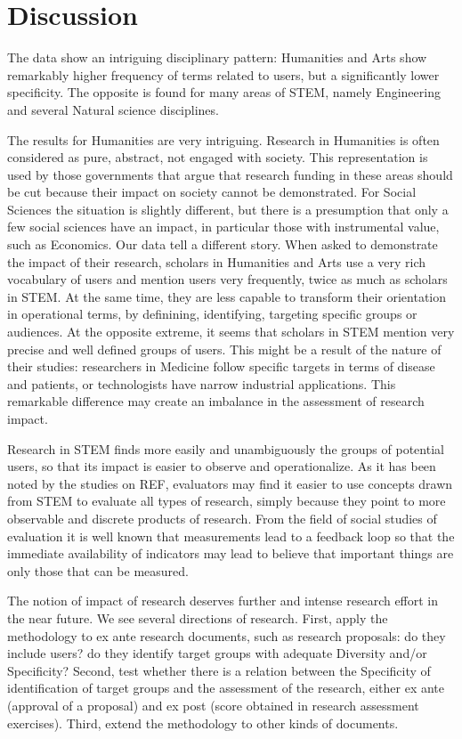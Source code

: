 \documentclass[]{book}
\begin{document}
\section{Discussion}\label{discussion-1}

The data show an intriguing disciplinary pattern: Humanities and Arts
show remarkably higher frequency of terms related to users, but a
significantly lower specificity. The opposite is found for many areas of
STEM, namely Engineering and several Natural science disciplines.

The results for Humanities are very intriguing. Research in Humanities
is often considered as pure, abstract, not engaged with society. This
representation is used by those governments that argue that research
funding in these areas should be cut because their impact on society
cannot be demonstrated. For Social Sciences the situation is slightly
different, but there is a presumption that only a few social sciences
have an impact, in particular those with instrumental value, such as
Economics. Our data tell a different story. When asked to demonstrate
the impact of their research, scholars in Humanities and Arts use a very
rich vocabulary of users and mention users very frequently, twice as
much as scholars in STEM. At the same time, they are less capable to
transform their orientation in operational terms, by definining,
identifying, targeting specific groups or audiences. At the opposite
extreme, it seems that scholars in STEM mention very precise and well
defined groups of users. This might be a result of the nature of their
studies: researchers in Medicine follow specific targets in terms of
disease and patients, or technologists have narrow industrial
applications. This remarkable difference may create an imbalance in the
assessment of research impact.

Research in STEM finds more easily and unambiguously the groups of
potential users, so that its impact is easier to observe and
operationalize. As it has been noted by the studies on REF, evaluators
may find it easier to use concepts drawn from STEM to evaluate all types
of research, simply because they point to more observable and discrete
products of research. From the field of social studies of evaluation it
is well known that measurements lead to a feedback loop so that the
immediate availability of indicators may lead to believe that important
things are only those that can be measured.

The notion of impact of research deserves further and intense research
effort in the near future. We see several directions of research. First,
apply the methodology to ex ante research documents, such as research
proposals: do they include users? do they identify target groups with
adequate Diversity and/or Specificity? Second, test whether there is a
relation between the Specificity of identification of target groups and
the assessment of the research, either ex ante (approval of a proposal)
and ex post (score obtained in research assessment exercises). Third,
extend the methodology to other kinds of documents.
\end{document}
